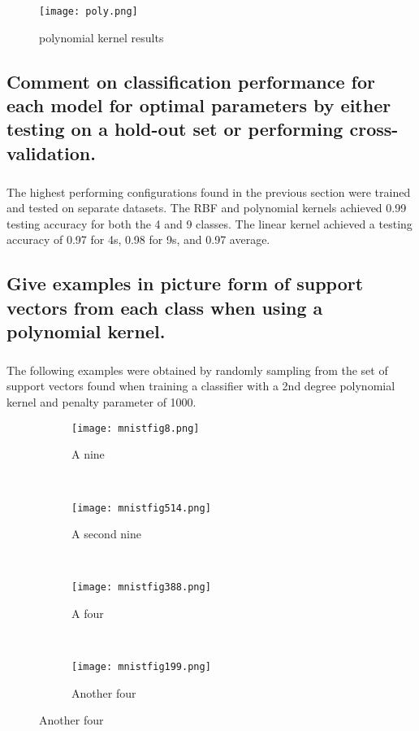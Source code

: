\documentclass[11pt]{article}
\begin{document}
\begin{figure}[H]
\centering
	\texttt{[image: poly.png]}
	\caption{polynomial kernel results}
\end{figure}

\subsection{Comment on classification performance for each model for optimal parameters by either testing on a hold-out set or performing cross-validation.}

\subparagraph{}

The highest performing configurations found in the previous section were trained and tested on separate datasets. The RBF and polynomial kernels achieved 0.99 testing accuracy for both the 4 and 9 classes. The linear kernel achieved a testing accuracy of 0.97 for 4s, 0.98 for 9s, and 0.97 average.

\subsection{Give examples in picture form of support vectors from each class when using a polynomial kernel.}

\subparagraph{}

The following examples were obtained by randomly sampling from the set of support vectors found when training a classifier with a 2nd degree polynomial kernel and penalty parameter of 1000.

\begin{figure}[h]
	\centering
	\begin{subfigure}[b]{0.2\linewidth}
		\texttt{[image: mnistfig8.png]}
		\caption{A nine}
	\end{subfigure}
	~
	\begin{subfigure}[b]{0.2\linewidth}
		\texttt{[image: mnistfig514.png]}
		\caption{A second nine}
	\end{subfigure}
	~
	\begin{subfigure}[b]{0.2\linewidth}
		\texttt{[image: mnistfig388.png]}
		\caption{A four}
	\end{subfigure}
	~
	\begin{subfigure}[b]{0.2\linewidth}
		\texttt{[image: mnistfig199.png]}
		\caption{Another four}
	\end{subfigure}
\end{figure}
\end{document}
